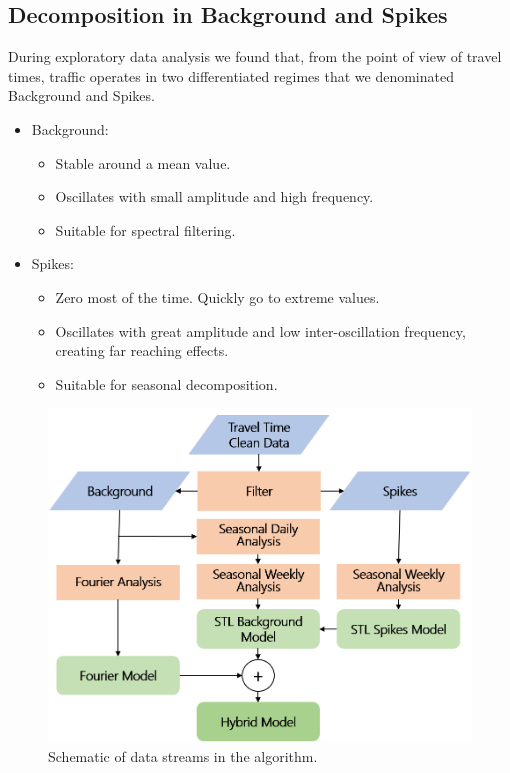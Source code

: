 \documentclass[conference, letterpaper]{IEEEtran}
\begin{document}
\subsection{Decomposition in Background and Spikes}
During exploratory data analysis we found that, from the point of view of travel times, traffic operates in two differentiated regimes that we denominated Background and Spikes. 
\begin{itemize}
	\item Background: 
	\begin{itemize}
		\item Stable around a mean value.
		\item Oscillates with small amplitude and high frequency.
		\item Suitable for spectral filtering.
	\end{itemize}
	\item Spikes: 
	\begin{itemize}
		\item Zero most of the time. Quickly go to extreme values.
		\item Oscillates with great amplitude and low inter-oscillation frequency, creating far reaching effects.
		\item Suitable for seasonal decomposition.
	\end{itemize}
\end{itemize}

\begin{figure}[htbp]
	\centering
	\includegraphics[width=\linewidth]{new_flow2.png}
	\caption{Schematic of data streams in the algorithm.}
	\label{fig:flowchart}
\end{figure}
\end{document}
